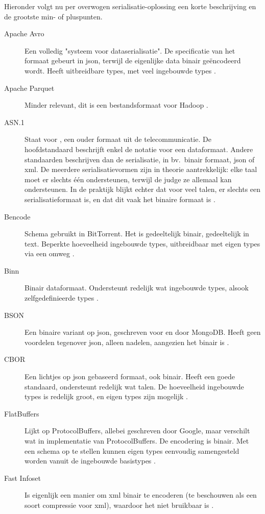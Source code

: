 Hieronder volgt nu per overwogen serialisatie-oplossing een korte beschrijving en de grootste min- of pluspunten.

\begin{description}
    \item[Apache Avro] Een volledig "systeem voor dataserialisatie".
    De specificatie van het formaat gebeurt in json, terwijl de eigenlijke data binair geëncodeerd wordt.
    Heeft uitbreidbare types, met veel ingebouwde types \autocite{avro}.
    \item[Apache Parquet] Minder relevant, dit is een bestandsformaat voor Hadoop \autocite{parquet}.
    \item[ASN.1] Staat voor , een ouder formaat uit de telecommunicatie.
    De hoofdstandaard beschrijft enkel de notatie voor een dataformaat.
    Andere standaarden beschrijven dan de serialisatie, in bv.\ binair formaat, json of xml.
    De meerdere serialisatievormen zijn in theorie aantrekkelijk: elke taal moet er slechts één ondersteunen, terwijl de judge ze allemaal kan ondersteunen.
    In de praktijk blijkt echter dat voor veel talen, er slechts een serialisatieformaat is, en dat dit vaak het binaire formaat is \autocite{x680}.
    \item[Bencode] Schema gebruikt in BitTorrent.
    Het is gedeeltelijk binair, gedeeltelijk in text.
    Beperkte hoeveelheid ingebouwde types, uitbreidbaar met eigen types via een omweg \autocite{cohen2017}.
    \item[Binn] Binair dataformaat.
    Ondersteunt redelijk wat ingebouwde types, alsook zelfgedefinieerde types \autocite{ramos2019}.
    \item[BSON] Een binaire variant op json, geschreven voor en door MongoDB\@.
    Heeft geen voordelen tegenover json, alleen nadelen, aangezien het binair is \autocite{bson}.
    \item[CBOR] Een lichtjes op json gebaseerd formaat, ook binair.
    Heeft een goede standaard, ondersteunt redelijk wat talen.
    De hoeveelheid ingebouwde types is redelijk groot, en eigen types zijn mogelijk \autocite{rfc7049}.
    \item[FlatBuffers] Lijkt op ProtocolBuffers, allebei geschreven door Google, maar verschilt wat in implementatie van ProtocolBuffers.
    De encodering is binair.
    Met een schema op te stellen kunnen eigen types eenvoudig samengesteld worden vanuit de ingebouwde basistypes \autocite{flatbuffers}.
    \item[Fast Infoset] Is eigenlijk een manier om xml binair te encoderen (te beschouwen als een soort compressie voor xml), waardoor het niet bruikbaar is \autocite{x981}.

\end{description}
